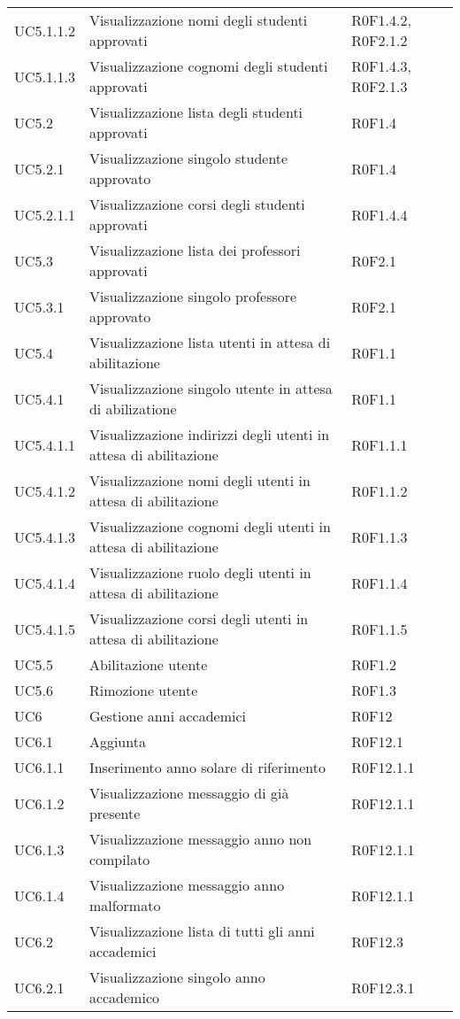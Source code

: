 \documentclass[AnalisiDeiRequisiti.tex]{subfiles}
\begin{document}
\begin{longtable}[H]{p{2cm}p{5cm}p{5cm}}
	UC5.1.1.2 & Visualizzazione nomi degli studenti approvati & R0F1.4.2, R0F2.1.2 \\
	UC5.1.1.3 & Visualizzazione cognomi degli studenti approvati & R0F1.4.3, R0F2.1.3 \\
	UC5.2 & Visualizzazione lista degli studenti approvati & R0F1.4 \\
	UC5.2.1 & Visualizzazione singolo studente approvato & R0F1.4 \\
	UC5.2.1.1 & Visualizzazione corsi degli studenti approvati & R0F1.4.4 \\
	UC5.3 & Visualizzazione lista dei professori approvati & R0F2.1 \\
	UC5.3.1 & Visualizzazione singolo professore approvato & R0F2.1 \\
	UC5.4 & Visualizzazione lista utenti in attesa di abilitazione & R0F1.1 \\
	UC5.4.1 & Visualizzazione singolo utente in attesa di abilizatione & R0F1.1 \\
	UC5.4.1.1 & Visualizzazione indirizzi degli utenti in attesa di abilitazione & R0F1.1.1 \\
	UC5.4.1.2 & Visualizzazione nomi degli utenti in attesa di abilitazione & R0F1.1.2 \\
	UC5.4.1.3 & Visualizzazione cognomi degli utenti in attesa di abilitazione & R0F1.1.3 \\
	UC5.4.1.4 & Visualizzazione ruolo degli utenti in attesa di abilitazione &R0F1.1.4  \\
	UC5.4.1.5 & Visualizzazione corsi degli utenti in attesa di abilitazione & R0F1.1.5 \\
	UC5.5 & Abilitazione utente & R0F1.2 \\
	UC5.6 & Rimozione utente & R0F1.3 \\
	UC6 & Gestione anni accademici & R0F12 \\
	UC6.1 & Aggiunta \citGloss{anno accademico} & R0F12.1 \\
	UC6.1.1 & Inserimento anno solare di riferimento & R0F12.1.1 \\
	UC6.1.2 & Visualizzazione messaggio di \citGloss{anno accademico} già presente & R0F12.1.1 \\
	UC6.1.3 & Visualizzazione messaggio anno non compilato & R0F12.1.1 \\
	UC6.1.4 & Visualizzazione messaggio anno malformato & R0F12.1.1 \\
	UC6.2 & Visualizzazione lista di tutti gli anni accademici & R0F12.3 \\
	UC6.2.1 & Visualizzazione singolo anno accademico & R0F12.3.1 \\

\end{longtable}
\end{document}
